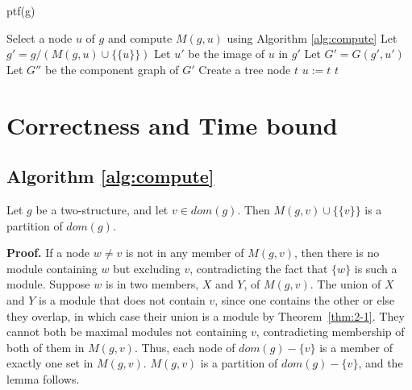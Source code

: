 \begin{algorithm}[H]
    \caption{ptf(g)}
    \label{alg:ptf}
    Select a node $u$ of $g$ and compute $M(g, u)$ using Algorithm \ref{alg:compute}\;
    Let $g' = g / (M(g, u) \cup \{\{u\}\})$\;
    Let $u'$ be the image of $u$ in $g'$\;
    Let $G' = G(g', u')$\;
    Let $G''$ be the component graph of $G'$\;
    Create a tree node $t$\;
    $u := t$\;
    \Return $t$\;
\end{algorithm}


\section{Correctness and Time bound}\label{sec:correctness-and-time-bound}

\subsection{Algorithm \ref{alg:compute}}\label{subsec:algorithm-compute}

\begin{mylem}
    \label{lem:lemma-4-1}
    Let $g$ be a two-structure, and let $v \in dom(g)$.
    Then $M(g, v) \cup \{\{v\}\}$ is a partition of $dom(g)$.
\end{mylem}

\textbf{Proof.}
If a node $w \neq v$ is not in any member of $M(g, v)$, then there is no module containing $w$ but excluding $v$, contradicting the fact that $\{w\}$ is such a module.
Suppose $w$ is in two members, $X$ and $Y$, of $M(g, v)$.
The union of $X$ and $Y$ is a module that does not contain $v$, since one contains the other or else they overlap, in which case their union is a module by Theorem~\ref{thm:2-1}.
They cannot both be maximal modules not containing $v$, contradicting membership of both of them in $M(g, v)$.
Thus, each node of $dom(g) - \{v\}$ is a member of exactly one set in $M(g, v)$.
$M(g, v)$ is a partition of $dom(g) - \{v\}$, and the lemma follows.


